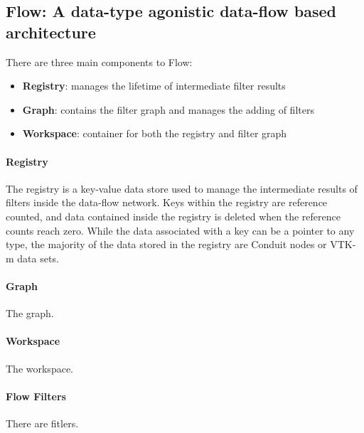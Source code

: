 \subsection{Flow: A data-type agonistic data-flow based architecture}

There are three main components to Flow:
\begin{itemize}
  \item \textbf{Registry}: manages the lifetime of intermediate filter results
  \item \textbf{Graph}: contains the filter graph and manages the adding of filters
  \item \textbf{Workspace}: container for both the registry and filter graph
\end{itemize}

\paragraph{Registry}
The registry is a key-value data store used to manage the intermediate
results of filters inside the data-flow network.
%
Keys within the registry are reference counted, and data contained
inside the registry is deleted when the reference counts reach zero.
%
While the data associated with a key can be a pointer to any type,
the majority of the data stored in the registry are Conduit nodes
or VTK-m data sets.

\paragraph{Graph}
The graph.

\paragraph{Workspace}
The workspace.

\paragraph{Flow Filters}
There are fitlers.


